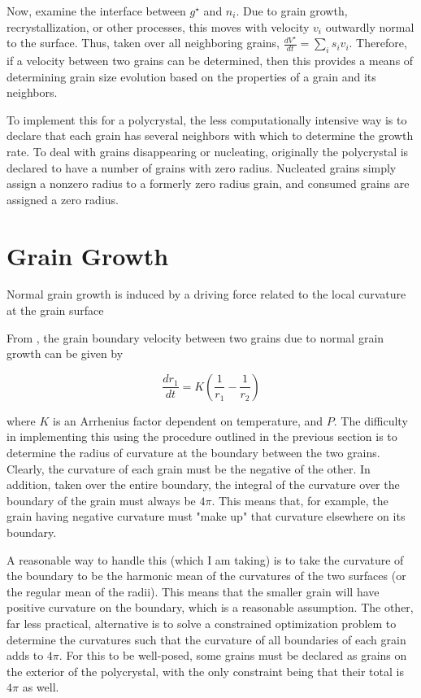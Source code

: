 \documentclass{article}
\begin{document}
Now, examine the interface between $g^{\star}$ and $n_i$. Due to grain growth, recrystallization, or other processes, this moves with velocity $v_i$ outwardly normal to the surface. Thus, taken over all neighboring grains, $\frac{dV^{\star}}{dt}=\sum_{i}s_i v_i$. Therefore, if a velocity between two grains can be determined, then this provides a means of determining grain size evolution based on the properties of a grain and its neighbors.

To implement this for a polycrystal, the less computationally intensive way is to declare that each grain has several neighbors with which to determine the growth rate. To deal with grains disappearing or nucleating, originally the polycrystal is declared to have a number of grains with zero radius. Nucleated grains simply assign a nonzero radius to a formerly zero radius grain, and consumed grains are assigned a zero radius. 

\section{Grain Growth}
Normal grain growth is induced by a driving force related to the local curvature at the grain surface

From \citet{durand2006}, the grain boundary velocity between two grains due to normal grain growth can be given by

\[\frac{dr_1}{dt} = K \left( \frac{1}{r_1}-\frac{1}{r_2} \right)
\]

where $K$ is an Arrhenius factor dependent on temperature, and $P$. The difficulty in implementing this using the procedure outlined in the previous section is to determine the radius of curvature at the boundary between the two grains. Clearly, the curvature of each grain must be the negative of the other. In addition, taken over the entire boundary, the integral of the curvature over the boundary of the grain must always be $4 \pi$. This means that, for example, the grain having negative curvature must "make up" that curvature elsewhere on its boundary. 

A reasonable way to handle this (which I am taking)  is to take the curvature of the boundary to be the harmonic mean of the curvatures of the two surfaces (or the regular mean of the radii). This means that the smaller grain will have positive curvature on the boundary, which is a reasonable assumption. The other, far less practical, alternative is to solve a constrained optimization problem to determine the curvatures such that the curvature of all boundaries of each grain adds to $4 \pi$. For this to be well-posed, some grains must be declared as grains on the exterior of the polycrystal, with the only constraint being that their total is $4 \pi$ as well. 
\end{document}
